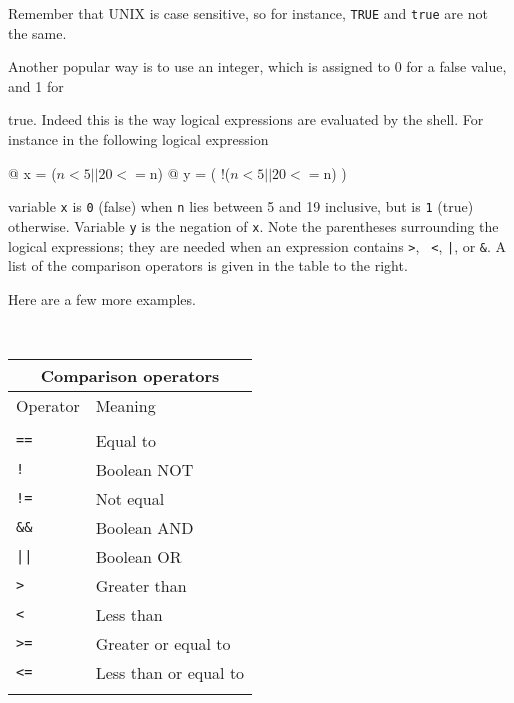 \documentclass[twoside,11pt,nolof]{starlink}
\providecommand{\latexelsehtml}[2]{#1}
\begin{document}
\begin{small}
\end{small}
Remember that UNIX is case sensitive, so for instance, \texttt{TRUE} and
\texttt{true} are not the same.

Another popular way is to use an integer, which is assigned to 0 for
a false value, and 1 for
\begin{minipage}{80mm}
\smallskip
true.  Indeed this is the way logical expressions are evaluated by the
shell.  For instance in the following logical expression

\begin{small}
\begin{terminalv}
     @ x = ($n < 5 || 20 <= $n)
     @ y = ( !($n < 5 || 20 <= $n) )
\end{terminalv}
\end{small}
variable \texttt{x} is \texttt{0} (false) when \texttt{n} lies between 5 and 19
inclusive, but is \texttt{1} (true) otherwise.  Variable \texttt{y} is the
negation of \texttt{x}.  Note the parentheses surrounding the logical
expressions; they are needed when an expression contains \texttt{>}, {\tt
<}, \texttt{|}, or \texttt{\&}.  A list of the comparison operators is given
in the table \latexelsehtml{to the right}{below}.
\smallskip

Here are a few more examples.
\end{minipage}
\ \hfill \
\begin{minipage}{64mm}
\vspace*{3mm}
\label{sc4_tab_comp_oper}
\begin{tabular}{ll}
\hline
\multicolumn{2}{c}{Comparison operators} \\ \hline
Operator & Meaning \\ \hline
\vspace*{-\medskipamount} \\
\texttt{==} & Equal to \\
\texttt{!}  & Boolean NOT \\
\texttt{!=} & Not equal \\
\texttt{\&\&} & Boolean AND \\
\texttt{||} & Boolean OR \\
\texttt{>} & Greater than \\
\texttt{<} & Less than \\
\texttt{>=} & Greater or equal to \\
\texttt{<=} & Less than or equal to \\
\vspace*{-\medskipamount} \\ \hline
\end{tabular}
\end{minipage}
\vspace*{1mm}
\end{document}
